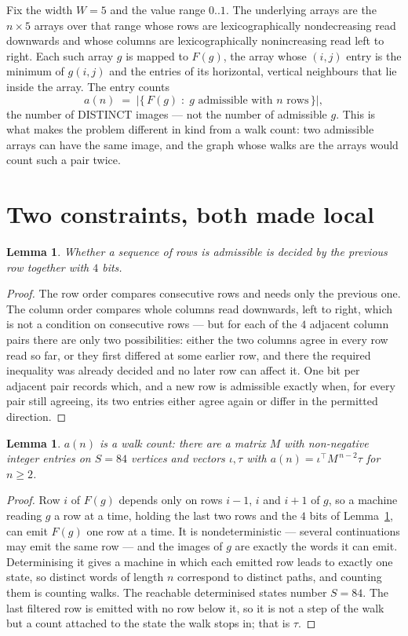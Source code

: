 \documentclass[11pt,a4paper]{article}
\theoremstyle{plain}
\newtheorem{lemma}[theorem]{Lemma}
\theoremstyle{definition}
\begin{document}
Fix the width $W=5$ and the value range $0..1$. The underlying arrays are the
$n\times5$ arrays over that range whose rows are lexicographically nondecreasing read downwards
and whose columns are lexicographically nonincreasing read left to right. Each such array $g$
is mapped to $F(g)$, the array whose $(i,j)$ entry is the minimum of $g(i,j)$ and the entries
of its horizontal, vertical neighbours that lie inside the array. The entry counts
\[
a(n)\;=\;\bigl|\{\,F(g)\;:\;g\text{ admissible with }n\text{ rows}\,\}\bigr|,
\]
the number of DISTINCT images --- not the number of admissible $g$. This is what makes the
problem different in kind from a walk count: two admissible arrays can have the same image, and
the graph whose walks are the arrays would count such a pair twice.

\section{Two constraints, both made local}

\begin{lemma}\label{lem:local}
Whether a sequence of rows is admissible is decided by the previous row together with
$4$ bits.
\end{lemma}

\begin{proof}
The row order compares consecutive rows and needs only the previous one. The column order
compares whole columns read downwards, left to right, which is not a condition on consecutive
rows --- but for each of the $4$ adjacent column pairs there are only two possibilities:
either the two columns agree in every row read so far, or they first differed at some earlier
row, and there the required inequality was already decided and no later row can affect it. One
bit per adjacent pair records which, and a new row is admissible exactly when, for every pair
still agreeing, its two entries either agree again or differ in the permitted direction.
\end{proof}

\begin{lemma}\label{lem:det}
$a(n)$ is a walk count: there are a matrix $M$ with non-negative integer entries on $S=84$
vertices and vectors $\iota,\tau$ with $a(n)=\iota^{\!\top}M^{\,n-2}\tau$ for $n\ge2$.
\end{lemma}

\begin{proof}
Row $i$ of $F(g)$ depends only on rows $i-1$, $i$ and $i+1$ of $g$, so a machine reading $g$ a
row at a time, holding the last two rows and the $4$ bits of Lemma~\ref{lem:local}, can
emit $F(g)$ one row at a time. It is nondeterministic --- several continuations may emit the
same row --- and the images of $g$ are exactly the words it can emit. Determinising it gives a
machine in which each emitted row leads to exactly one state, so distinct words of length $n$
correspond to distinct paths, and counting them is counting walks. The reachable determinised
states number $S=84$. The last filtered row is emitted with no row below it, so it is not a
step of the walk but a count attached to the state the walk stops in; that is $\tau$.
\end{proof}
\end{document}

